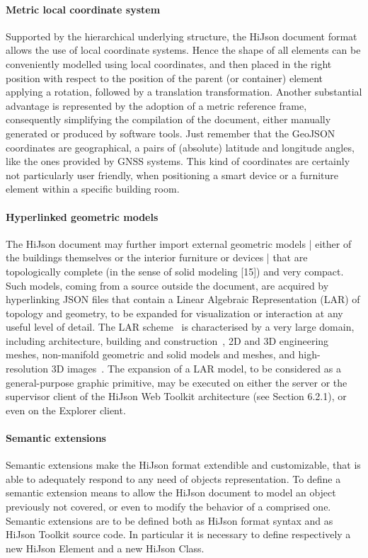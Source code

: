 \documentclass{sig-alternate}
\begin{document}
\paragraph{Metric local coordinate system}

Supported by the hierarchical underlying structure, the HiJson document format allows the use of local coordinate systems. Hence the shape of all elements can be conveniently modelled using local coordinates, and then placed in the right position with respect to the position of the parent (or container) element applying a rotation, followed by a translation transformation.
Another substantial advantage is represented by the adoption of a metric reference frame, consequently simplifying the compilation of the document, either manually generated or produced by software tools. Just remember that the GeoJSON coordinates are geographical, a pairs of (absolute) latitude and longitude angles, like the ones provided by GNSS systems. This kind of coordinates are certainly not particularly user friendly, when positioning a smart device or a furniture element within a specific building room.

\paragraph{Hyperlinked geometric models}

The HiJson document may further import external geometric models | either of the buildings themselves or the interior furniture or devices | that are topologically complete (in the sense of solid modeling [15]) and very compact. Such models, coming from a source outside the document, are acquired by hyperlinking JSON files that contain a Linear Algebraic Representation (LAR) of topology and geometry, to be expanded for visualization or interaction at any useful level of detail.
The LAR scheme~\cite{Dicarlo:2014:TNL:2543138.2543294} is characterised by a very large domain, including architecture, building and construction~\cite{paoluzziMS:2014}, 2D and 3D engineering meshes, non-manifold geometric and solid models and meshes, and high-resolution 3D images~\cite{cadanda:2015}. 
The expansion of a LAR model, to be considered as a general-purpose graphic primitive, may be executed on either the server or the supervisor client of the HiJson Web Toolkit architecture (see Section 6.2.1), or even on the Explorer client.

\paragraph{Semantic extensions}
Semantic extensions make the HiJson format extendible and customizable, that is able to adequately respond to any need of objects representation. To define a semantic extension means to allow the HiJson document to model an object previously not covered, or even to modify the behavior of a comprised one. Semantic extensions are to be defined both as HiJson format syntax and as HiJson Toolkit source code. In particular it is necessary to define respectively a new HiJson Element and a new HiJson Class.
\end{document}
